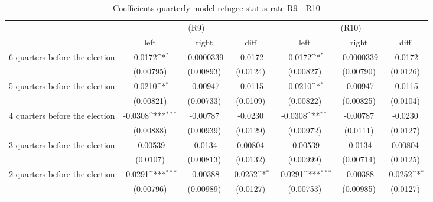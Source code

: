 \begin{table}[!ht]\centering \footnotesize
\def\sym#1{\ifmmode^{#1}\else\(^{#1}\)\fi}
\caption{Coefficients quarterly model refugee status rate R9 - R10}
\begin{tabular}{l*{6}{c}}
\hline\hline
                    &\multicolumn{3}{c}{(R9)}&\multicolumn{3}{c}{(R10)}\\
&\multicolumn{1}{c}{left}&\multicolumn{1}{c}{right}&\multicolumn{1}{c}{diff}&\multicolumn{1}{c}{left}&\multicolumn{1}{c}{right}&\multicolumn{1}{c}{diff}\\
\hline
 6 quarters before the election&     -0.0172\sym{*}  &  -0.0000339         &     -0.0172         &     -0.0172\sym{*}  &  -0.0000339         &     -0.0172         \\
                    &   (0.00795)         &   (0.00893)         &    (0.0124)         &   (0.00827)         &   (0.00790)         &    (0.0126)         \\
[0,5em]
 5 quarters before the election&     -0.0210\sym{*}  &    -0.00947         &     -0.0115         &     -0.0210\sym{*}  &    -0.00947         &     -0.0115         \\
                    &   (0.00821)         &   (0.00733)         &    (0.0109)         &   (0.00822)         &   (0.00825)         &    (0.0104)         \\
[0,5em]
 4 quarters before the election&     -0.0308\sym{***}&    -0.00787         &     -0.0230         &     -0.0308\sym{**} &    -0.00787         &     -0.0230         \\
                    &   (0.00888)         &   (0.00939)         &    (0.0129)         &   (0.00972)         &    (0.0111)         &    (0.0127)         \\
[0,5em]
 3 quarters before the election&    -0.00539         &     -0.0134         &     0.00804         &    -0.00539         &     -0.0134         &     0.00804         \\
                    &    (0.0107)         &   (0.00813)         &    (0.0132)         &   (0.00999)         &   (0.00714)         &    (0.0125)         \\
[0,5em]
 2 quarters before the election&     -0.0291\sym{***}&    -0.00388         &     -0.0252\sym{*}  &     -0.0291\sym{***}&    -0.00388         &     -0.0252\sym{*}  \\
                    &   (0.00796)         &   (0.00989)         &    (0.0127)         &   (0.00753)         &   (0.00985)         &    (0.0127)         \\

\end{tabular}
\end{table}
